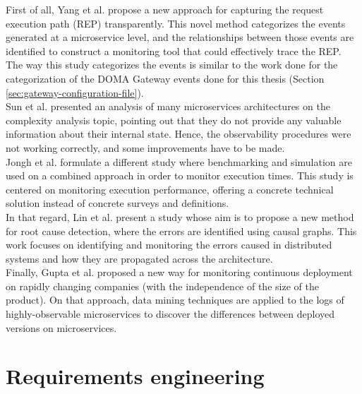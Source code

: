 \documentclass[english, 12pt, a4paper, sci, utf8, a-1b, online]{aaltothesis}
\begin{document}
First of all, Yang et al. \cite{yang2018transparently} propose a new approach for capturing the request execution path (REP) transparently. This novel method categorizes the events generated at a microservice level, and the relationships between those events are identified to construct a monitoring tool that could effectively trace the REP. The way this study categorizes the events is similar to the work done for the categorization of the DOMA Gateway events done for this thesis (Section \ref{sec:gateway-configuration-file}).\\

Sun et al. \cite{sun2018constraint} presented an analysis of many microservices architectures on the complexity analysis topic, pointing out that they do not provide any valuable information about their internal state. Hence, the observability procedures were not working correctly, and some improvements have to be made.\\

Jongh et al.\cite{johng2018estimating} formulate a different study where benchmarking and simulation are used on a combined approach in order to monitor execution times. This study is centered on monitoring execution performance, offering a concrete technical solution instead of concrete surveys and definitions.\\

In that regard, Lin et al. \cite{lin2018microscope} present a study whose aim is to propose a new method for root cause detection, where the errors are identified using causal graphs. This work focuses on identifying and monitoring the errors caused in distributed systems and how they are propagated across the architecture.\\

Finally, Gupta et al. \cite{gupta2018runtime} proposed a new way for monitoring continuous deployment on rapidly changing companies (with the independence of the size of the product). On that approach, data mining techniques are applied to the logs of highly-observable microservices to discover the differences between deployed versions on microservices.\\

\clearpage
\section{Requirements engineering}
\label{sec:requirements-eng}

\end{document}
